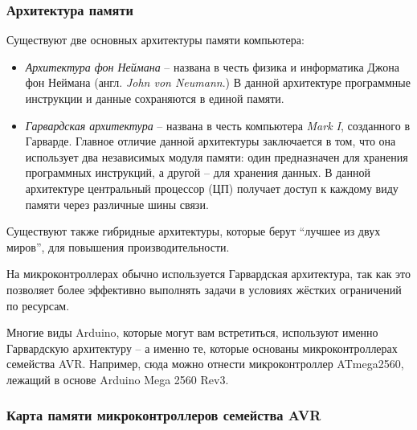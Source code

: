 \documentclass[../sparc.tex]{subfiles}
\begin{document}
\subsubsection{Архитектура памяти}

Существуют две основных архитектуры памяти компьютера:
\begin{itemize}
\item \emph{Архитектура фон Неймана} -- названа в честь физика и информатика
  Джона фон Неймана (англ. \textit{John von Neumann}.)  В данной архитектуре
  программные инструкции и данные сохраняются в единой памяти.
\item \emph{Гарвардская архитектура} -- названа в честь компьютера \emph{Mark I},
  созданного в Гарварде.  Главное отличие данной архитектуры заключается в том,
  что она использует два независимых модуля памяти: один предназначен для
  хранения программных инструкций, а другой -- для хранения данных.  В данной
  архитектуре центральный процессор (ЦП) получает доступ к каждому виду памяти
  через различные шины связи.
\end{itemize}

Существуют также гибридные архитектуры, которые берут ``лучшее из двух миров'',
для повышения производительности.

На микроконтроллерах обычно используется Гарвардская архитектура, так как это
позволяет более эффективно выполнять задачи в условиях жёстких ограничений по
ресурсам.

Многие виды Arduino, которые могут вам встретиться, используют именно
Гарвардскую архитектуру -- а именно те, которые основаны микроконтроллерах
семейства AVR.  Например, сюда можно отнести микроконтроллер ATmega2560, лежащий
в основе Arduino Mega 2560 Rev3.\cite{arduino:memory-guide}

\subsubsection{Карта памяти микроконтроллеров семейства AVR}

  
\end{document}
